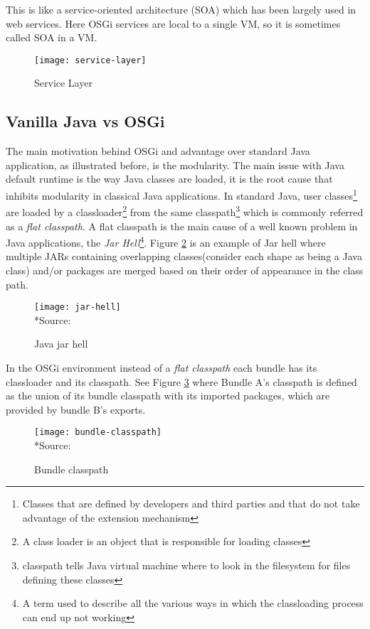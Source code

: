 This is like a service-oriented architecture (SOA) which has been largely used in web services. Here OSGi services are local to a single VM, so it is sometimes called SOA in a VM.

\begin{figure}[h]
\label{service layer}
\caption{Service Layer}
\centering
\texttt{[image: service-layer]}
\end{figure}
\FloatBarrier


\subsection{Vanilla Java vs OSGi}
The main motivation behind OSGi and advantage over standard Java application, as illustrated before, is the modularity. The main issue with Java default runtime is the way Java classes are loaded, it is the root cause that inhibits modularity in classical Java applications. In standard Java, user classes\footnote{Classes that are defined by developers and third parties and that do not take advantage of the extension mechanism} are loaded by a classloader\footnote{A class loader is an object that is responsible for loading classes} from the same classpath\footnote{classpath tells Java virtual machine where to look in the filesystem for files defining these classes} which is commonly referred as a \emph{flat classpath}. A flat classpath is the main cause of a well known problem in Java applications, the \emph{Jar Hell}\footnote{A term used to describe all the various ways in which the classloading process can end up not working}. Figure \ref{jar hell} is an example of Jar hell where multiple JARs containing overlapping classes(consider each shape as being a Java class) and/or packages are merged based on their order of appearance in the class path.


\begin{figure}[h]
\caption{Java jar hell}
\label{jar hell}
\centering
\texttt{[image: jar-hell]}
\\*Source: \cite[p. 7]{Hall 2011}
\end{figure}  
\FloatBarrier


 In the OSGi environment instead of a \emph{flat classpath} each bundle has its classloader and its classpath. See Figure \ref{bundle classpath} where Bundle A’s classpath is defined as the union of its bundle classpath with its imported packages, which are provided by bundle B’s exports.


\begin{figure}[h]
\caption{Bundle classpath}
\label{bundle classpath}
\centering
\texttt{[image: bundle-classpath]}
\\*Source: \cite[p. 59]{Hall 2011}
\end{figure}  
\FloatBarrier

